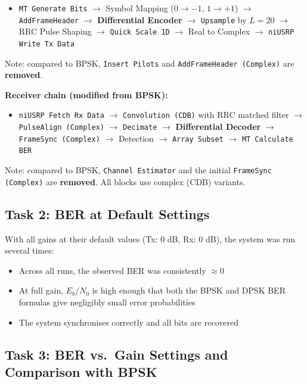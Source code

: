 \begin{itemize}
\item \texttt{MT Generate Bits} $\rightarrow$ Symbol Mapping ($0 \rightarrow -1$, $1 \rightarrow +1$) $\rightarrow$ \texttt{AddFrameHeader} $\rightarrow$ \textbf{Differential Encoder} $\rightarrow$ \texttt{Upsample} by $L = 20$ $\rightarrow$ RRC Pulse Shaping $\rightarrow$ \texttt{Quick Scale 1D} $\rightarrow$ Real to Complex $\rightarrow$ \texttt{niUSRP Write Tx Data}
\end{itemize}

Note: compared to BPSK, \texttt{Insert Pilots} and \texttt{AddFrameHeader (Complex)} are \textbf{removed}.

\textbf{Receiver chain (modified from BPSK):}

\begin{itemize}
\item \texttt{niUSRP Fetch Rx Data} $\rightarrow$ \texttt{Convolution (CDB)} with RRC matched filter $\rightarrow$ \texttt{PulseAlign (Complex)} $\rightarrow$ \texttt{Decimate} $\rightarrow$ \textbf{Differential Decoder} $\rightarrow$ \texttt{FrameSync (Complex)} $\rightarrow$ Detection $\rightarrow$ \texttt{Array Subset} $\rightarrow$ \texttt{MT Calculate BER}
\end{itemize}

Note: compared to BPSK, \texttt{Channel Estimator} and the initial \texttt{FrameSync (Complex)} are \textbf{removed}. All blocks use complex (CDB) variants.

\subsection{Task 2: BER at Default Settings}

With all gains at their default values (Tx: 0 dB, Rx: 0 dB), the system was run several times:

\begin{itemize}
\item Across all runs, the observed BER was consistently $\approx 0$
\item At full gain, $E_b/N_0$ is high enough that both the BPSK and DPSK BER formulas give negligibly small error probabilities
\item The system synchronises correctly and all bits are recovered
\end{itemize}

\subsection{Task 3: BER vs.\ Gain Settings and Comparison with BPSK}

